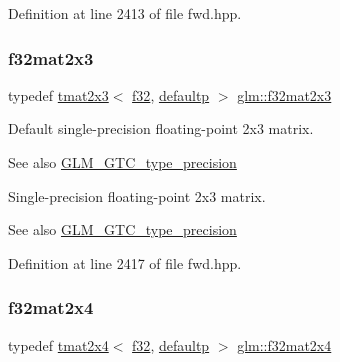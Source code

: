 Definition at line 2413 of file fwd.\+hpp.

\mbox{\label{group__gtc__type__precision_gac4573d3d213b2bce23943caef565a211}} 
\subsubsection{\texorpdfstring{f32mat2x3}{f32mat2x3}}
{\footnotesize\ttfamily typedef \mbox{\hyperlink{structglm_1_1tmat2x3}{tmat2x3}}$<$ \mbox{\hyperlink{group__gtc__type__precision_ga0ec999b57f5330d9021256e96038df04}{f32}}, \mbox{\hyperlink{namespaceglm_a0f04f086094c747d227af4425893f545a9d21ccd8b5a009ec7eb7677befc3bf51}{defaultp}} $>$ \mbox{\hyperlink{group__gtc__type__precision_gac4573d3d213b2bce23943caef565a211}{glm\+::f32mat2x3}}}

Default single-\/precision floating-\/point 2x3 matrix. \begin{DoxySeeAlso}{See also}
\mbox{\hyperlink{group__gtc__type__precision}{G\+L\+M\+\_\+\+G\+T\+C\+\_\+type\+\_\+precision}}
\end{DoxySeeAlso}
Single-\/precision floating-\/point 2x3 matrix. \begin{DoxySeeAlso}{See also}
\mbox{\hyperlink{group__gtc__type__precision}{G\+L\+M\+\_\+\+G\+T\+C\+\_\+type\+\_\+precision}} 
\end{DoxySeeAlso}


Definition at line 2417 of file fwd.\+hpp.

\mbox{\label{group__gtc__type__precision_gab0eab14575c18077fd3415539bce685a}} 
\subsubsection{\texorpdfstring{f32mat2x4}{f32mat2x4}}
{\footnotesize\ttfamily typedef \mbox{\hyperlink{structglm_1_1tmat2x4}{tmat2x4}}$<$ \mbox{\hyperlink{group__gtc__type__precision_ga0ec999b57f5330d9021256e96038df04}{f32}}, \mbox{\hyperlink{namespaceglm_a0f04f086094c747d227af4425893f545a9d21ccd8b5a009ec7eb7677befc3bf51}{defaultp}} $>$ \mbox{\hyperlink{group__gtc__type__precision_gab0eab14575c18077fd3415539bce685a}{glm\+::f32mat2x4}}}

